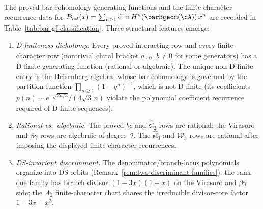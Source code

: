 \begin{theorem}
\label{thm:bar-gf-classification}
The proved bar cohomology generating functions and the finite-character
recurrence data for
$P_\cA(x) = \sum_{n \geq 1} \dim H^n(\barBgeom(\cA))\, x^n$
are recorded in Table~\textup{\ref{tab:bar-gf-classification}}.
Three structural features emerge:
\begin{enumerate}[label=\textup{(\roman*)}]
\item \emph{D-finiteness dichotomy.}
 Every proved interacting row and every finite-character row
 \textup{(}nontrivial chiral bracket $a_{(0)}b \neq 0$ for some
 generators\textup{)} has a D-finite generating function
 \textup{(}rational or algebraic\textup{)}.
 The unique non-D-finite entry is the Heisenberg algebra,
 whose bar cohomology is governed by the partition function
 $\prod_{n \geq 1}(1 - q^n)^{-1}$, which is not D-finite
 \textup{(}its coefficients $p(n) \sim
 e^{\pi\sqrt{2n/3}}/(4\sqrt{3}\,n)$ violate the polynomial
 coefficient recurrence required of D-finite
 sequences\textup{)}.
\item \emph{Rational vs.\ algebraic.}
 The proved $bc$ and $\widehat{\mathfrak{sl}}_2$ rows are rational;
 the Virasoro and $\beta\gamma$ rows are algebraic of degree~$2$.
 The $\widehat{\mathfrak{sl}}_3$ and $\mathcal{W}_3$ rows are rational
 after imposing the displayed finite-character recurrences.
\item \emph{DS-invariant discriminant.}
 The denominator\slash branch-locus polynomials organize into
 DS orbits
 \textup{(}Remark~\textup{\ref{rem:two-discriminant-families})}\textup{:}
 the rank-one family has branch divisor $(1-3x)(1+x)$ on the
 Virasoro and $\beta\gamma$ side; the $A_2$ finite-character chart
 shares the irreducible divisor-core factor $1 - 3x - x^2$.
\end{enumerate}
\end{theorem}

